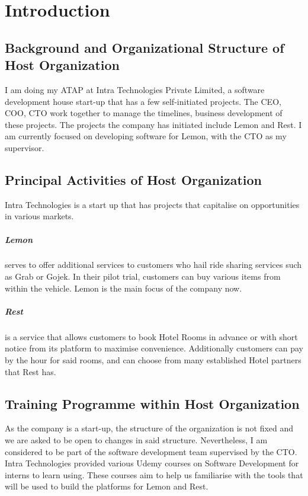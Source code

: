 \section{Introduction}
\subsection{Background and Organizational Structure of Host Organization}
\noindent
I am doing my ATAP at Intra Technologies Private Limited, a software development house start-up that has a few self-initiated projects.
The CEO, COO, CTO work together to manage the timelines, business development of these projects.
The projects the company has initiated include Lemon and Rest. I am currently focused on developing software for Lemon, with the CTO as my supervisor. 

\subsection{Principal Activities of Host Organization}
\noindent
Intra Technologies is a start up that has projects that capitalise on opportunities in various markets.

\subparagraph{Lemon}
serves to offer additional services to customers who hail ride sharing services such as Grab or Gojek. In their
pilot trial, customers can buy various items from within the vehicle. Lemon is the main focus of the company now.

\subparagraph{Rest}
is a service that allows customers to book Hotel Rooms in advance or with short notice from its platform to 
maximise convenience. Additionally customers can pay by the hour for said rooms, and can choose from 
many established Hotel partners that Rest has.

\subsection{Training Programme within Host Organization}
\noindent
As the company is a start-up, the structure of the organization is not fixed and we are asked to be open to changes in said structure. 
Nevertheless, I am considered to be part of the software development team supervised by the CTO.
Intra Technologies provided various Udemy courses on Software Development for interns to learn using. These courses aim to help us familiarise with
the tools that will be used to build the platforms for Lemon and Rest.
